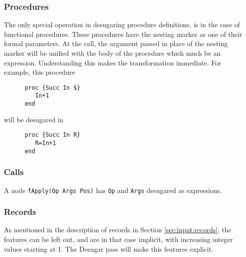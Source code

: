 \documentclass[a4paper]{memoir}
\begin{document}
\subsubsection{Procedures}\label{sec:arch:desugar:procedures}
The only special operation in desugaring procedure definitions, is in the case
of functional procedures. These procedures have the nesting marker as one of
their formal parameters. At the call, the argument passed in place of the
nesting marker will be unified with the body of the procedure which much be an
expression. 
Understanding this makes the transformation immediate. For example, this procedure
\begin{lstlisting}
      proc {Succ In $}
         In+1
      end
\end{lstlisting}

will be desugared in

\begin{lstlisting}
      proc {Succ In R}
         R=In+1
      end
\end{lstlisting}
\subsubsection{Calls}\label{sec:arch:desugar:calls}
A node \lstinline!fApply(Op Args Pos)! has \lstinline!Op! and \lstinline!Args!
desugared as expressions.
\subsubsection{Records}\label{sec:arch:desugar:records}
As mentioned in the description of records in Section \ref{sec:input:records}, the features can be left out, and are in that case implicit, with increasing integer values starting at 1. The Desugar pass will make this features explicit.
\end{document}
